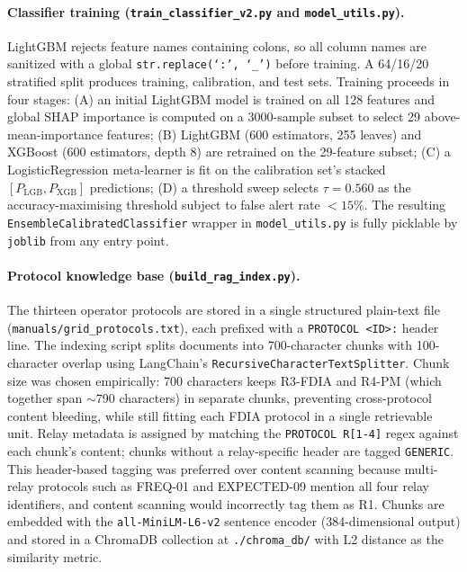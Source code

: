 \documentclass[twocolumn, 10pt, letterpaper]{article}
\begin{document}
\paragraph{Classifier training (\texttt{train\_classifier\_v2.py} and
\texttt{model\_utils.py}).}
LightGBM rejects feature names containing colons, so all column names are
sanitized with a global \texttt{str.replace(`:', `\_')} before training.
A 64/16/20 stratified split produces training, calibration, and test sets.
Training proceeds in four stages:
(A) an initial LightGBM model is trained on all 128 features and global SHAP
importance is computed on a 3000-sample subset to select 29 above-mean-importance
features;
(B) LightGBM (600 estimators, 255 leaves) and XGBoost (600 estimators, depth 8)
are retrained on the 29-feature subset;
(C) a LogisticRegression meta-learner is fit on the calibration set's stacked
$[P_\text{LGB}, P_\text{XGB}]$ predictions;
(D) a threshold sweep selects $\tau = 0.560$ as the accuracy-maximising threshold
subject to false alert rate $< 15\%$.
The resulting \texttt{EnsembleCalibratedClassifier} wrapper in \texttt{model\_utils.py}
is fully picklable by \texttt{joblib} from any entry point.

\paragraph{Protocol knowledge base (\texttt{build\_rag\_index.py}).}
The thirteen operator protocols are stored in a single structured plain-text
file (\texttt{manuals/grid\_protocols.txt}), each prefixed with a
\texttt{PROTOCOL <ID>:} header line.
The indexing script splits documents into 700-character chunks with
100-character overlap using LangChain's \texttt{RecursiveCharacterTextSplitter}.
Chunk size was chosen empirically: 700 characters keeps R3-FDIA and R4-PM
(which together span $\sim$790 characters) in separate chunks, preventing
cross-protocol content bleeding, while still fitting each FDIA protocol in
a single retrievable unit.
Relay metadata is assigned by matching the \texttt{PROTOCOL R[1-4]} regex
against each chunk's content; chunks without a relay-specific header are
tagged \texttt{GENERIC}.
This header-based tagging was preferred over content scanning because
multi-relay protocols such as FREQ-01 and EXPECTED-09 mention all four relay
identifiers, and content scanning would incorrectly tag them as R1.
Chunks are embedded with the \texttt{all-MiniLM-L6-v2} sentence encoder
(384-dimensional output) and stored in a ChromaDB collection at
\texttt{./chroma\_db/} with L2 distance as the similarity metric.
\end{document}
